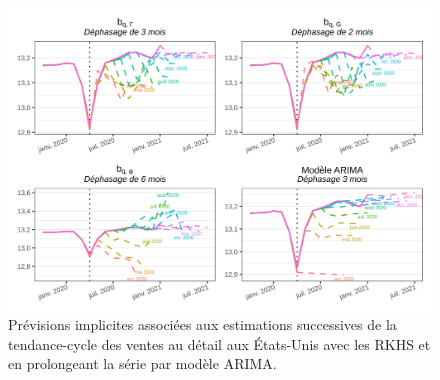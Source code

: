 \documentclass[
  12pt,
  a4paper,french]{article}
\newcommand\1{\mathds{1}}
\begin{document}
\begin{figure}

{\centering \includegraphics[width=0.9\linewidth]{img/nber/retailx_rkhs_arima_implicit_forecast} 

}

\caption[Prévisions implicites associées aux estimations successives de la tendance-cycle des ventes au détail aux États-Unis avec les RKHS et en prolongeant la série par modèle ARIMA]{Prévisions implicites associées aux estimations successives de la tendance-cycle des ventes au détail aux États-Unis avec les RKHS et en prolongeant la série par modèle ARIMA.}\label{fig:retailxiprkhs}

\footnotesize
\normalsize\end{figure}
\end{document}
